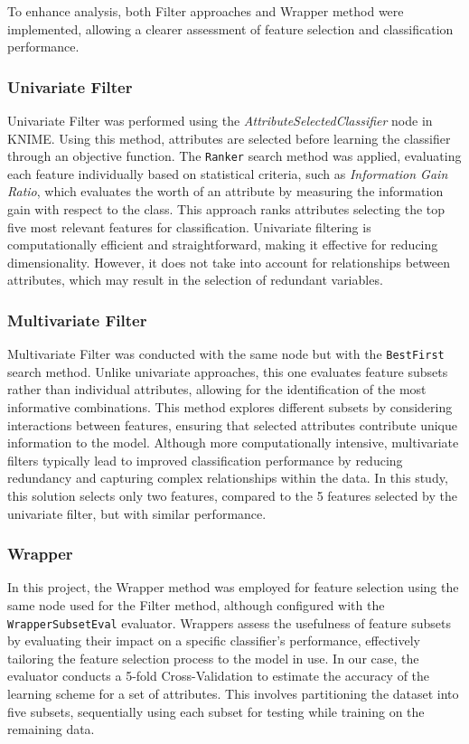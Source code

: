 To enhance analysis, both Filter approaches and Wrapper method were implemented, allowing a clearer assessment of feature selection and classification performance.
\subsubsection{Univariate Filter}
Univariate Filter was performed using the \textit{AttributeSelectedClassifier} node in KNIME. Using this method, attributes are selected before learning the classifier through an objective function. The \texttt{Ranker} search method was applied, evaluating each feature individually based on statistical criteria, such as \textit{Information Gain Ratio}, which evaluates the worth of an attribute by measuring the information gain with respect to the class. This approach ranks attributes selecting the top five most relevant features for classification. Univariate filtering is computationally efficient and straightforward, making it effective for reducing dimensionality. However, it does not take into account for relationships between attributes, which may result in the selection of redundant variables.
\subsubsection{Multivariate Filter}
Multivariate Filter was conducted with the same node but with the \texttt{BestFirst} search method. Unlike univariate approaches, this one evaluates feature subsets rather than individual attributes, allowing for the identification of the most informative combinations. This method explores different subsets by considering interactions between features, ensuring that selected attributes contribute unique information to the model. Although more computationally intensive, multivariate filters typically lead to improved classification performance by reducing redundancy and capturing complex relationships within the data. In this study, this solution selects only two features, compared to the 5 features selected by the univariate filter, but with similar performance.
\subsubsection{Wrapper}
In this project, the Wrapper method was employed for feature selection using the same node used for the Filter method, although configured with the \texttt{WrapperSubsetEval} evaluator. Wrappers assess the usefulness of feature subsets by evaluating their impact on a specific classifier's performance, effectively tailoring the feature selection process to the model in use. In our case, the evaluator conducts a 5-fold Cross-Validation to estimate the accuracy of the learning scheme for a set of attributes. This involves partitioning the dataset into five subsets, sequentially using each subset for testing while training on the remaining data. 

